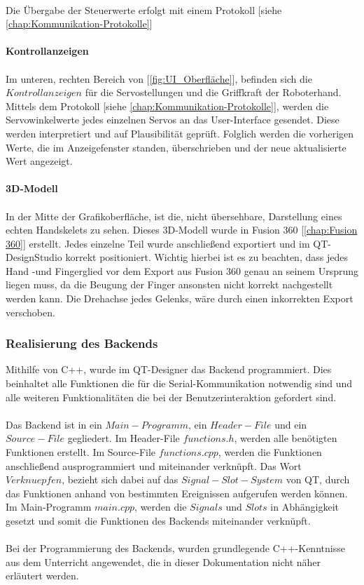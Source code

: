 \documentclass[titlepage,12pt,twoside]{article}
\begin{document}
\\
Die Übergabe der Steuerwerte erfolgt mit einem Protokoll [siehe \textcolor{blue}{\autoref{chap:Kommunikation-Protokolle}}] \\
\\
\textbf{Kontrollanzeigen} \\ 
\\
Im unteren, rechten Bereich von [\textcolor{blue}{\autoref{fig:UI_Oberfläche}}], befinden sich die $Kontrollanzeigen$ für die Servostellungen und die Griffkraft der Roboterhand. Mittels dem Protokoll [siehe \textcolor{blue}{\autoref{chap:Kommunikation-Protokolle}}], werden
die Servowinkelwerte jedes einzelnen Servos an das User-Interface gesendet. Diese werden interpretiert und auf Plausibilität geprüft. Folglich werden die vorherigen Werte, die im Anzeigefenster standen, überschrieben und der neue aktualisierte Wert angezeigt. \\
\\
\textbf{3D-Modell} \\
\\
In der Mitte der Grafikoberfläche, ist die, nicht übersehbare, Darstellung eines echten Handskelets zu sehen. Dieses 3D-Modell wurde in Fusion 360 [\textcolor{blue}{\autoref{chap:Fusion 360}}] erstellt. Jedes einzelne Teil wurde anschließend exportiert und im QT-DesignStudio korrekt positioniert. Wichtig
hierbei ist es zu beachten, dass jedes Hand -und Fingerglied vor dem Export aus Fusion 360 genau an seinem Ursprung liegen muss, da die Beugung der Finger ansonsten nicht korrekt nachgestellt werden kann. Die Drehachse jedes Gelenks, wäre durch einen inkorrekten Export
verschoben.  

\subsubsection{Realisierung des Backends}
Mithilfe von C++, wurde im QT-Designer das Backend programmiert. Dies beinhaltet alle Funktionen die für die Serial-Kommunikation notwendig sind und alle weiteren Funktionalitäten die bei der Benutzerinteraktion gefordert sind. \\
\\
Das Backend ist in ein $Main-Programm$, ein $Header-File$ und ein $Source-File$ gegliedert. Im Header-File $functions.h$, werden alle benötigten Funktionen erstellt. Im Source-File $functions.cpp$, werden die Funktionen anschließend 
ausprogrammiert und miteinander verknüpft. Das Wort $Verknuepfen$, bezieht sich dabei auf das $Signal-Slot-System$ von QT, durch das Funktionen anhand von bestimmten Ereignissen aufgerufen werden können. Im Main-Programm $main.cpp$, werden die $Signals$
und $Slots$ in Abhängigkeit gesetzt und somit die Funktionen des Backends miteinander verknüpft. \\
\\
Bei der Programmierung des Backends, wurden grundlegende C++-Kenntnisse aus dem Unterricht angewendet, die in dieser Dokumentation nicht näher erläutert werden.
\end{document}
